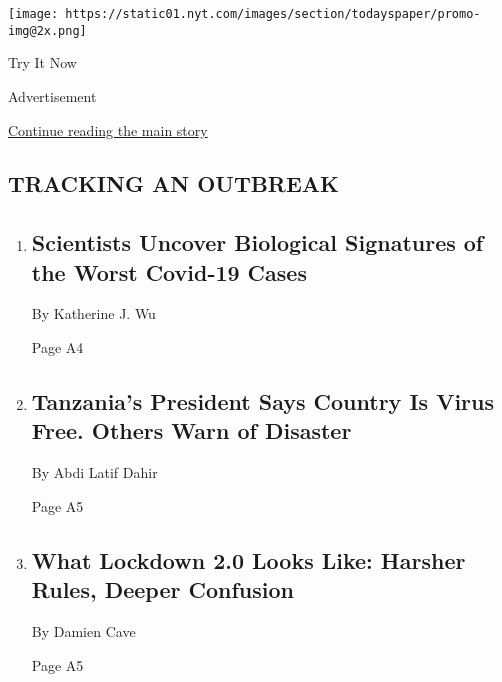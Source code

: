 \texttt{[image: https://static01.nyt.com/images/section/todayspaper/promo-img@2x.png]}

Try It Now

Advertisement

\protect\hyperlink{after-mid1}{Continue reading the main story}

\hypertarget{tracking-an-outbreak}{%
\subsection{TRACKING AN OUTBREAK}\label{tracking-an-outbreak}}

\begin{enumerate}
\def\labelenumi{\arabic{enumi}.}
\item
  \href{/2020/08/04/health/coronavirus-immune-system.html}{}

  \hypertarget{scientists-uncover-biological-signatures-of-the-worst-covid-19-cases}{%
  \subsection{Scientists Uncover Biological Signatures of the Worst
  Covid-19
  Cases}\label{scientists-uncover-biological-signatures-of-the-worst-covid-19-cases}}

  By Katherine J. Wu

  Page A4
\item
  \href{/2020/08/04/world/africa/tanzanias-coronavirus-president.html}{}

  \hypertarget{tanzanias-president-says-country-is-virus-free-others-warn-of-disaster}{%
  \subsection{Tanzania's President Says Country Is Virus Free. Others
  Warn of
  Disaster}\label{tanzanias-president-says-country-is-virus-free-others-warn-of-disaster}}

  By Abdi Latif Dahir

  Page A5
\item
  \href{/2020/08/04/world/australia/coronavirus-melbourne-lockdown.html}{}

  \hypertarget{what-lockdown-20-looks-like-harsher-rules-deeper-confusion}{%
  \subsection{What Lockdown 2.0 Looks Like: Harsher Rules, Deeper
  Confusion}\label{what-lockdown-20-looks-like-harsher-rules-deeper-confusion}}

  By Damien Cave

  Page A5
\end{enumerate}

